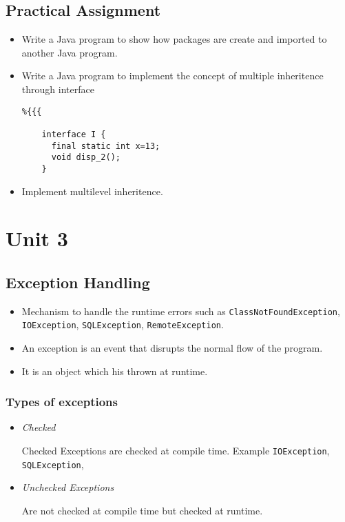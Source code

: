 \documentclass[11pt, a4paper, oneside]{book}
\begin{document}
\section{Practical Assignment}
\begin{itemize}
\item Write a Java program to show how packages are create and
  imported to another Java program.
\item Write a Java program to implement the concept of multiple
  inheritence through interface

    \begin{lstlisting}%{{{

    interface I {
      final static int x=13;
      void disp_2();
    }

    \end{lstlisting}%

\item Implement multilevel inheritence.
\end{itemize}

\chapter{Unit 3}
\section{Exception Handling}
\begin{itemize}
  \item Mechanism to handle the runtime errors such as \texttt{ClassNotFoundException}, \texttt{IOException}, \texttt{SQLException}, \texttt{RemoteException}.
  \item An exception is an event that disrupts the normal flow of the program.
  \item It is an object which his thrown at runtime.
\end{itemize}

\subsection{Types of exceptions}
\begin{itemize}
  \item \textit{Checked}

    Checked Exceptions are checked at compile time. Example \texttt{IOException}, \texttt{SQLException},

  \item \textit{Unchecked Exceptions}

    Are not checked at compile time but checked at runtime.
\end{itemize}
\end{document}
